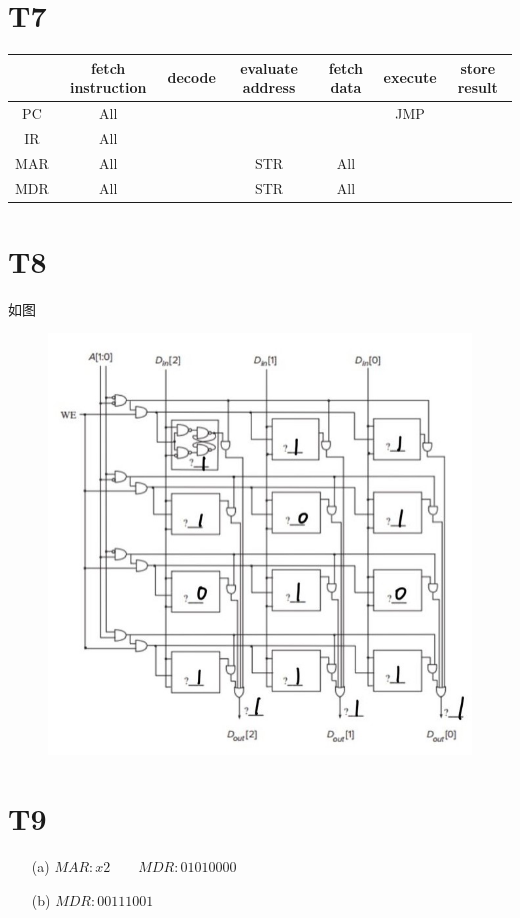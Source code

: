 \documentclass{article}
\begin{document}
\section*{T7}
    \begin{table}[!ht]
        \centering
        \begin{tabular}{|c|c|c|c|c|c|c|}
        \hline
            ~ & fetch instruction & decode & evaluate address & fetch data & execute & store result  \\ \hline
            PC & All & ~ & ~ & ~ & JMP &   \\ \hline
            IR & All & ~ & ~ & ~ & ~ &   \\ \hline
            MAR & All & ~ & STR & All & ~ &   \\ \hline
            MDR & All & ~ & STR & All & ~ &   \\ \hline
        \end{tabular}
    \end{table}
\section*{T8}如图
\begin{figure}[htbp]
    \centering
    \includegraphics[scale=0.8]{t8.jpg}
\end{figure}
\section*{T9}
\begin{enumerate}
    \item [(a)]$MAR:x2 \qquad MDR:01010000$
    \item [(b)]$MDR: 00111001$
\end{enumerate}
\end{document}
